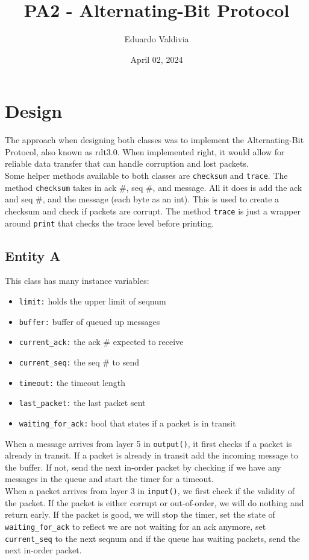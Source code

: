 \documentclass{article}
\title{PA2 - Alternating-Bit Protocol}
\date{April 02, 2024}
\author{Eduardo Valdivia}
\begin{document}
\maketitle
\section{Design}
The approach when designing both classes was to implement the Alternating-Bit
Protocol, also known as rdt3.0. When implemented right, it would allow for
reliable data transfer that can handle corruption and lost packets. \\

\noindent Some helper methods available to both classes are \texttt{checksum}
and \texttt{trace}. The method \texttt{checksum} takes in ack \#, seq \#, and
message. All it does is add the ack and seq \#, and the message (each byte as an
int). This is used to create a checksum and check if packets are corrupt. The method \texttt{trace} is just a wrapper around \texttt{print} that checks the trace level before printing.

\subsection{Entity A}
This class has many instance variables:
\begin{itemize}
\item \texttt{limit:} holds the upper limit of seqnum
\item \texttt{buffer:} buffer of queued up messages
\item \texttt{current\_ack:} the ack \# expected to receive
\item \texttt{current\_seq:} the seq \# to send
\item \texttt{timeout:} the timeout length
\item \texttt{last\_packet:} the last packet sent
\item \texttt{waiting\_for\_ack:} bool that states if a packet is in transit
\end{itemize}
When a message arrives from layer 5 in \texttt{output()}, it first checks if a
packet is already in transit. If a packet is already in transit add the incoming
message to the buffer. If not, send the next in-order packet by checking if we
have any messages in the queue and start the timer for a timeout. \\

\noindent When a packet arrives from layer 3 in \texttt{input()}, we first check
if the validity of the packet. If the packet is either corrupt or out-of-order,
we will do nothing and return early. If the packet is good, we will stop the
timer, set the state of \texttt{waiting\_for\_ack} to reflect we are not waiting
for an ack anymore, set \texttt{current\_seq} to the next seqnum and if the queue has waiting packets, send the next in-order
packet. \\
\end{document}
